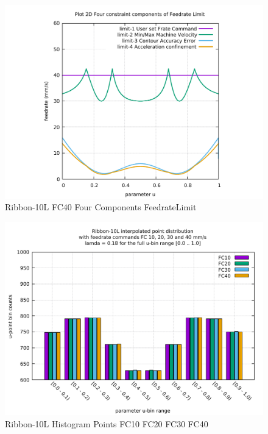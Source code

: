 \begin{figure}
	\caption     {Ribbon-10L FC40 Four Components FeedrateLimit}
	\label{34-img-Ribbon-10L-FC40-Four-Components-FeedrateLimit.pdf}
\includegraphics[width=1.00\textwidth]{Chap4/appendix/app-Ribbon-10L/plots/34-img-Ribbon-10L-FC40-Four-Components-FeedrateLimit.pdf}
\end{figure}


\clearpage
\pagebreak

\begin{figure}
	\centering
	\caption     {Ribbon-10L Histogram Points FC10 FC20 FC30 FC40}
	\label{35-img-Ribbon-10L-Histogram-Points-FC10-FC20-FC30-FC40.pdf}
\includegraphics[width=1.00\textwidth]{Chap4/appendix/app-Ribbon-10L/plots/35-img-Ribbon-10L-Histogram-Points-FC10-FC20-FC30-FC40.pdf} 
\end{figure}


